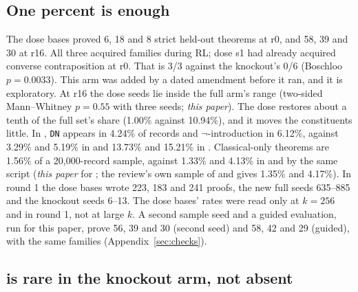 \subsection{One percent is enough}
\label{sec:dose}

The dose bases proved 6, 18 and 8 strict held-out theorems at r0, and 58, 39 and 30 at r16. All three acquired families
during RL; dose s1 had already acquired converse contraposition at r0. That is 3/3 against the knockout's 0/6 (Boschloo
$p = 0.0033$). This arm was added by a dated amendment before it ran, and it is exploratory. At r16 the dose seeds lie
inside the full arm's range (two-sided Mann--Whitney $p = 0.55$ with three seeds; \emph{this paper}). The dose restores
about a tenth of the full set's \sigp{} share (1.00\% against 10.94\%), and it moves the constituents little. In \KTdose{},
\texttt{DN} appears in 4.24\% of records and $\neg$-introduction in 6.12\%, against 3.29\% and 5.19\% in \KTko{} and
13.73\% and 15.21\% in \KT{}. Classical-only theorems are 1.56\% of a 20,000-record sample, against 1.33\% and 4.13\%
in \KTko{} and \KT{} by the same script (\emph{this paper} for \KTdose{}; the review's own sample of \KTko{} and \KT{} gives
1.35\% and 4.17\%). In round 1 the dose bases wrote 223, 183 and 241 \sig{} proofs, the new
full seeds 635--885 and the knockout seeds 6--13. The dose bases' rates were read only at $k = 256$ and in round 1, not
at large $k$. A second sample seed and a guided evaluation, run for this paper, prove 56, 39 and 30 (second seed) and
58, 42 and 29 (guided), with the same families (Appendix~\ref{sec:checks}).

\subsection{\sig{} is rare in the knockout arm, not absent}
\label{sec:rare}

